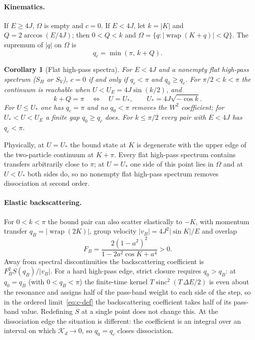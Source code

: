 \documentclass[12pt,a4paper]{article}
\newtheorem{corollary}{Corollary}
\theoremstyle{remark}
\newcommand{\Kd}{\mathcal{K}_d}
\newcommand{\wrap}{\operatorname{wrap}}
\newcommand{\sinc}{\operatorname{sinc}}
\newcommand{\Ustar}{U_{*}}
\begin{document}
\paragraph{Kinematics.} If $E\ge4J$, $\Omega$ is empty and $c=0$. If $E<4J$, let $k=|K|$ and $Q=2\arccos(E/4J)$; then $0<Q<k$ and $\Omega=\{q:|\wrap(K+q)|<Q\}$. The supremum of $|q|$ on $\Omega$ is
\begin{equation}\label{eq:qc}
q_c=\min(\pi,\,k+Q).
\end{equation}

\begin{corollary}[Flat high-pass spectra]\label{cor:highpass}
For $E<4J$ and a nonempty flat high-pass spectrum ($S_H$ or $S_V$), $c=0$ if and only if $q_c<\pi$ and $q_0\ge q_c$. For $\pi/2<k<\pi$ the continuum is reachable when $U<U_E=4J\sin(k/2)$, and
\begin{equation}\label{eq:Ustar}
k+Q=\pi\quad\Longleftrightarrow\quad U=\Ustar,\qquad \Ustar=4J\sqrt{-\cos k}.
\end{equation}
For $U\le\Ustar$ one has $q_c=\pi$ and no $q_0<\pi$ removes the $W^2$ coefficient; for $\Ustar<U<U_E$ a finite gap $q_0\ge q_c$ does. For $k\le\pi/2$ every pair with $E<4J$ has $q_c<\pi$.
\end{corollary}

Physically, at $U=\Ustar$ the bound state at $K$ is degenerate with the upper edge of the two-particle continuum at $K+\pi$. Every flat high-pass spectrum contains transfers arbitrarily close to $\pi$; at $U=\Ustar$ one side of this point lies in $\Omega$ and at $U<\Ustar$ both sides do, so no nonempty flat high-pass spectrum removes dissociation at second order.

\paragraph{Elastic backscattering.} For $0<k<\pi$ the bound pair can also scatter elastically to $-K$, with momentum transfer $q_B=|\wrap(2K)|$, group velocity $|v_B|=4J^2|\sin K|/E$ and overlap
\begin{equation}\label{eq:FB}
F_B=\frac{2(1-a^2)^2}{1-2a^2\cos K+a^4}>0 .
\end{equation}
Away from spectral discontinuities the backscattering coefficient is $F_B^2S(q_B)/|v_B|$. For a hard high-pass edge, strict closure requires $q_0>q_B$: at $q_0=q_B$ (with $0<q_B<\pi$) the finite-time kernel $T\sinc^2(T\,\Delta E/2)$ is even about the resonance and assigns half of the pass-band weight to each side of the step, so in the ordered limit~\eqref{eq:c-def} the backscattering coefficient takes half of its pass-band value. Redefining $S$ at a single point does not change this. At the dissociation edge the situation is different: the coefficient is an integral over an interval on which $\Kd\to0$, so $q_0=q_c$ closes dissociation.
\end{document}
